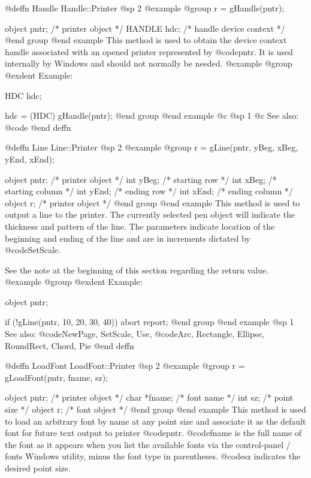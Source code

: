 @deffn {Handle} Handle::Printer
@sp 2
@example
@group
r = gHandle(pntr); 

object  pntr;   /*  printer object         */
HANDLE  hdc;    /*  handle device context  */
@end group
@end example
This method is used to obtain the device context handle associated with
an opened printer represented by @code{pntr}.  It is used internally
by Windows and should not normally be needed.
@example
@group
@exdent Example:

HDC     hdc;

hdc = (HDC) gHandle(pntr);
@end group
@end example
@c @sp 1
@c See also:  @code{}
@end deffn

















@deffn {Line} Line::Printer
@sp 2
@example
@group
r = gLine(pntr, yBeg, xBeg, yEnd, xEnd);

object  pntr;   /*  printer object   */
int     yBeg;   /*  starting row     */
int     xBeg;   /*  starting column  */
int     yEnd;   /*  ending row       */
int     xEnd;   /*  ending column    */
object  r;      /*  printer object   */
@end group
@end example
This method is used to output a line to the printer.  The currently
selected pen object will indicate the thickness and pattern of the line.
The parameters indicate location of the beginning and ending of the line
and are in increments dictated by @code{SetScale}.

See the note at the beginning of this section regarding the return value.
@example
@group
@exdent Example:

object  pntr;

if (!gLine(pntr, 10, 20, 30, 40))
        abort report;
@end group
@end example
@sp 1
See also:  @code{NewPage, SetScale, Use,}
        @code{Arc, Rectangle, Ellipse, RoundRect, Chord, Pie}
@end deffn












@deffn {LoadFont} LoadFont::Printer
@sp 2
@example
@group
r = gLoadFont(pntr, fname, sz);

object   pntr;  /*  printer object   */
char    *fname; /*  font name        */
int      sz;    /*  point size       */
object   r;     /*  font object      */
@end group
@end example
This method is used to load an arbitrary font by name at any point size
and associate it as the default font for future text output to printer
@code{pntr}.  @code{fname} is the full name of the font as it appears
when you list the available fonts via the control-panel / fonts Windows
utility, minus the font type in parentheses.  @code{sz} indicates the
desired point size.

